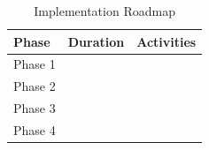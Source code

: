 
\begin{table}[H]

\centering

\caption{Implementation Roadmap}

\label{tab:roadmap}

\begin{tabular}{lll}

\toprule

Phase &
Duration &
Activities \\

\midrule

Phase 1 &&\\

Phase 2 &&\\

Phase 3 &&\\

Phase 4 &&\\

\bottomrule

\end{tabular}

\end{table}